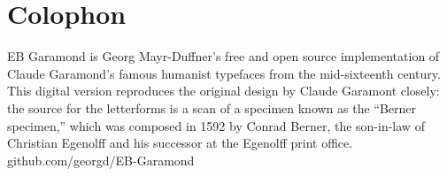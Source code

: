 \documentclass[
a5paper,
BCOR=7mm,
twoside,
DIV=calc,
11pt,
usegeometry,
chapterprefix,
headings=big,
numbers=noenddot,
listof=flat,
listof=nochaptergap]{scrbook}
\begin{document}
\pagestyle{headings}
\renewcommand*{\chapterpagestyle}{plain}
\newcommand{\moderatelyhuge}{\fontsize{40}{50}\selectfont}




 
 \mainmatter





















































{}
\chapter*{Colophon}

\centering
EB Garamond is Georg Mayr-Duffner's free and open source implementation of Claude Garamond’s famous humanist typefaces from the mid-sixteenth century. This digital version reproduces the original design by Claude Garamont closely: the source for the letterforms is a scan of a specimen known as the \enquote{Berner specimen,} which was composed in 1592 by Conrad Berner, the son-in-law of Christian Egenolff and his successor at the Egenolff print office.  \\github.com/georgd/EB-Garamond
\end{document}
